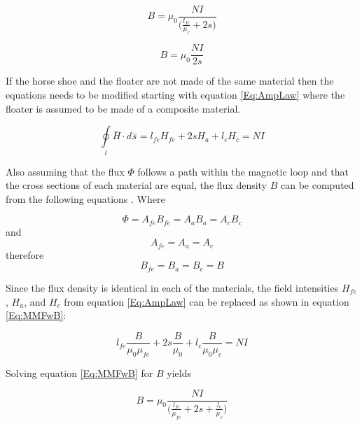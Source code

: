 \begin{equation}\label{Eq:BwFe}
	B={\mu }_{0}\frac{NI}{\Big(\frac{l_{fe}}{{\mu }_{r}}+2s\Big)}
\end{equation}

\begin{equation}\label{Eq:BwoFe}
	B={\mu }_{0}\frac{NI}{2s}
\end{equation}

If the horse shoe and the floater are not made of the same material then the equations needs to be modified starting with equation \ref{Eq:AmpLaw} where the floater is assumed to be made of a composite material. 

\begin{equation}\label{Eq:AmpLaw}
	\underset{l}{\oint }\stackrel{-}{H}\cdot d\stackrel{-}{s}={l}_{fe}{H}_{fe}+2s{H}_{a}+{l}_{c}{H}_{c}=NI
\end{equation}

Also assuming that the flux $\Phi$ follows a path within the magnetic loop and that the cross sections of each material are equal, the flux density $B$ can be computed from the following equations \cite{MagBear}. Where

\begin{equation}\label{Eq:flux}
	\Phi={A}_{fe}{B}_{fe}={A}_{a}{B}_{a}={A}_{c}{B}_{c}
\end{equation}
and
\begin{equation}\label{Eq:area}
	{A}_{fe}={A}_{a}={A}_{c}
\end{equation}
therefore
\begin{equation}\label{Eq:Beq}
	{B}_{fe}={B}_{a}={B}_{c}=B
\end{equation}



Since the flux density is identical in each of the materials, the field intensities ${H}_{fe}$, ${H}_{a}$, and ${H}_{c}$ from equation \ref{Eq:AmpLaw} can be replaced as shown in equation \ref{Eq:MMFwB}:

\begin{equation}\label{Eq:MMFwB}
	{l}_{fe}\frac{B}{{\mu}_{0}{\mu}_{fe}}+2s\frac{B}{{\mu}_{0}}+{l}_{c}\frac{B}{{\mu}_{0}{\mu}_{c}}=NI
\end{equation}

Solving equation \ref{Eq:MMFwB} for $B$ yields

\begin{equation}\label{Eq:B}
	B={\mu}_{0}\frac{NI}{\Big(\frac{{l}_{fe}}{{\mu}_{fe}}+2s+\frac{{l}_{c}}{{\mu}_{c}}\Big)}
\end{equation}


